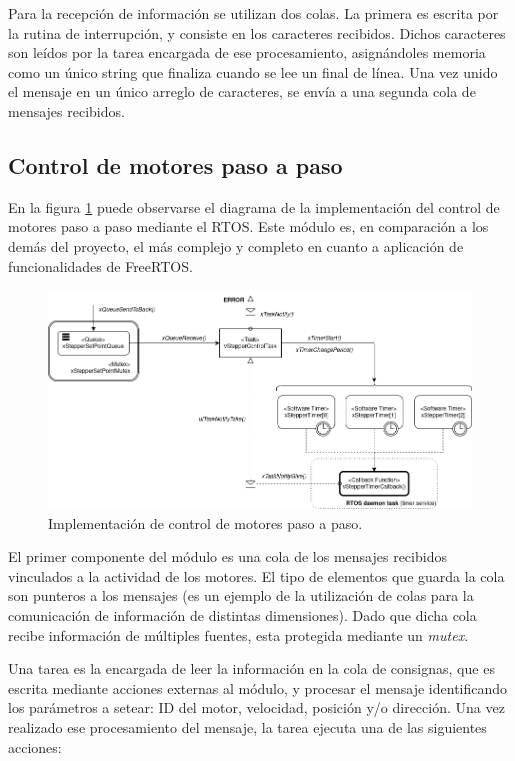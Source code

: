 \documentclass{IEEEtran}
\begin{document}
Para la recepción de información se utilizan dos colas. La primera es escrita por la rutina de interrupción, y consiste en los caracteres recibidos. Dichos caracteres son leídos por la tarea encargada de ese procesamiento, asignándoles memoria como un único string que finaliza cuando se lee un final de línea. Una vez unido el mensaje en un único arreglo de caracteres, se envía a una segunda cola de mensajes recibidos.

\subsection{Control de motores paso a paso}
\label{sec:stepper}

En la figura \ref{fig:diagrama-stepper} puede observarse el diagrama de la implementación del control de motores paso a paso mediante el RTOS. Este módulo es, en comparación a los demás del proyecto, el más complejo y completo en cuanto a aplicación de funcionalidades de FreeRTOS.

\begin{figure}[ht]
    \centering
    \includegraphics[scale=0.5]{../diagrama_stepper.png}
    \caption{Implementación de control de motores paso a paso.}
    \label{fig:diagrama-stepper}
\end{figure}

El primer componente del módulo es una cola de los mensajes recibidos vinculados a la actividad de los motores. El tipo de elementos que guarda la cola son punteros a los mensajes (es un ejemplo de la utilización de colas para la comunicación de información de distintas dimensiones). Dado que dicha cola recibe información de múltiples fuentes, esta protegida mediante un \textit{mutex}.

Una tarea es la encargada de leer la información en la cola de consignas, que es escrita mediante acciones externas al módulo, y procesar el mensaje identificando los parámetros a setear: ID del motor, velocidad, posición y/o dirección. Una vez realizado ese procesamiento del mensaje, la tarea ejecuta una de las siguientes acciones:
\end{document}
